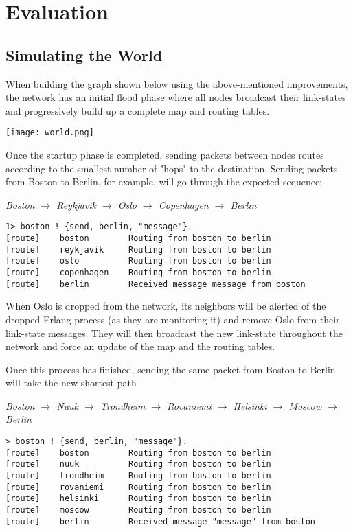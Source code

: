\documentclass[a4paper, 10pt]{article}
\begin{document}
\section{Evaluation}
\subsection{Simulating the World}
When building the graph shown below using the above-mentioned improvements, the network has an initial flood phase where all nodes broadcast their link-states and progressively build up a complete map and routing tables.

\texttt{[image: world.png]}

Once the startup phase is completed, sending packets between nodes routes according to the smallest number of "hops" to the destination. Sending packets from Boston to Berlin, for example, will go through the expected sequence:

\begin{center}
\textit{Boston $\rightarrow$ Reykjavik $\rightarrow$ Oslo $\rightarrow$ Copenhagen $\rightarrow$ Berlin}
\end{center}

\begin{verbatim}
1> boston ! {send, berlin, "message"}.
[route]    boston        Routing from boston to berlin
[route]    reykjavik     Routing from boston to berlin
[route]    oslo          Routing from boston to berlin
[route]    copenhagen    Routing from boston to berlin
[route]    berlin        Received message message from boston
\end{verbatim}

When Oslo is dropped from the network, its neighbors will be alerted of the dropped Erlang process (as they are monitoring it) and remove Oslo from their link-state messages. They will then broadcast the new link-state throughout the network and force an update of the map and the routing tables.

Once this process has finished, sending the same packet from Boston to Berlin will take the new shortest path

\begin{center}
\textit{Boston $\rightarrow$ Nuuk $\rightarrow$ Trondheim $\rightarrow$ Rovaniemi $\rightarrow$ Helsinki $\rightarrow$ Moscow $\rightarrow$ Berlin}
\end{center}

\begin{verbatim}
> boston ! {send, berlin, "message"}.
[route]    boston        Routing from boston to berlin
[route]    nuuk          Routing from boston to berlin
[route]    trondheim     Routing from boston to berlin
[route]    rovaniemi     Routing from boston to berlin
[route]    helsinki      Routing from boston to berlin
[route]    moscow        Routing from boston to berlin
[route]    berlin        Received message "message" from boston
\end{verbatim}
\end{document}
